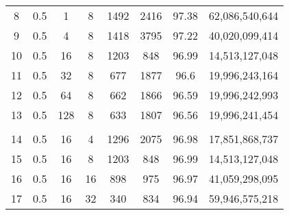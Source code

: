 \begin{table}[H]
\begin{tabular}{|c|c|c|c|c|c|c|c|}
        \hline
        8                      & 0.5                   & 1                     & 8                     & 1492                  & 2416                  & 97.38                 & 62,086,540,644           \\
        9                      & 0.5                   & 4                     & 8                     & 1418                  & 3795                  & 97.22                 & 40,020,099,414           \\
        10                     & 0.5                   & 16                    & 8                     & 1203                  & 848                   & 96.99                 & 14,513,127,048           \\
        11                     & 0.5                   & 32                    & 8                     & 677                   & 1877                  & 96.6                  & 19,996,243,164           \\
        12                     & 0.5                   & 64                    & 8                     & 662                   & 1866                  & 96.59                 & 19,996,242,993           \\
        13                     & 0.5                   & 128                   & 8                     & 633                   & 1807                  & 96.56                 & 19,996,241,454           \\
        \hline
        \multicolumn{1}{|l|}{} & \multicolumn{1}{l|}{} & \multicolumn{1}{l|}{} & \multicolumn{1}{l|}{} & \multicolumn{1}{l|}{} & \multicolumn{1}{l|}{} & \multicolumn{1}{l|}{} & \multicolumn{1}{l|}{}    \\
        \hline
        14                     & 0.5                   & 16                    & 4                     & 1296                  & 2075                  & 96.98                 & 17,851,868,737           \\
        15                     & 0.5                   & 16                    & 8                     & 1203                  & 848                   & 96.99                 & 14,513,127,048           \\
        16                     & 0.5                   & 16                    & 16                    & 898                   & 975                   & 96.97                 & 41,059,298,095           \\
        17                     & 0.5                   & 16                    & 32                    & 340                   & 834                   & 96.94                 & 59,946,575,218           \\

\end{tabular}
\end{table}
